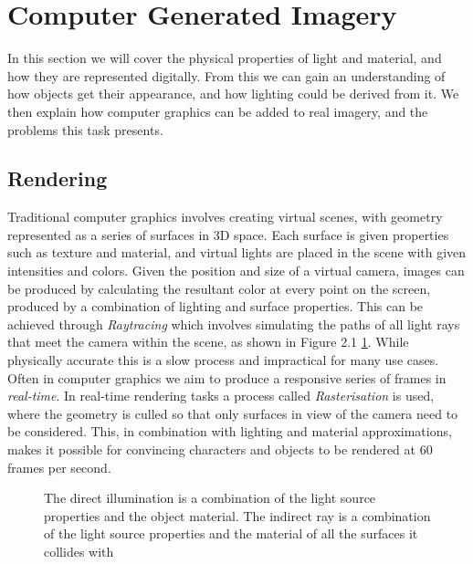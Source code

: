 \documentclass[ %
                    author={Gavin Parker},
                supervisor={Dr. Neill Campbell},
                    degree={MEng},
                     title={Deep Learning for Illumination Estimation from Stereo Images},
                  subtitle={},
                      type={Research},
                      year={2018} ]{dissertation}
\begin{document}
\section{Computer Generated Imagery}
In this section we will cover the physical properties of light and material, and how they are represented digitally. From this we can gain an understanding of how objects get their appearance, and how lighting could be derived from it. We then explain how computer graphics can be added to real imagery, and the problems this task presents.
\subsection{Rendering}
Traditional computer graphics involves creating virtual scenes, with geometry represented as a series of surfaces in 3D space. Each surface is given properties such as texture and material, and virtual lights are placed in the scene with given intensities and colors. Given the position and size of a virtual camera, images can be produced by calculating the resultant color at every point on the screen, produced by a combination of lighting and surface properties. This can be achieved through \textit{Raytracing} which involves simulating the paths of all light rays that meet the camera within the scene, as shown in Figure 2.1 \ref{fig:raytracing}. While physically accurate this is a slow process and impractical for many use cases. Often in computer graphics we aim to produce a responsive series of frames in \textit{real-time}. In real-time rendering tasks a process called \textit{Rasterisation} is used, where the geometry is culled so that only surfaces in view of the camera need to be considered. This, in combination with lighting and material approximations, makes it possible for convincing characters and objects to be rendered at 60 frames per second.
\newpage
\begin{center}
\begin{figure}[H]
\centering
{}
\label{fig:raytracing}
\caption{The direct illumination is a combination of the light source properties and the object material. The indirect ray is a combination of the light source properties and the material of all the surfaces it collides with}
\end{figure}
\end{center}
\end{document}
